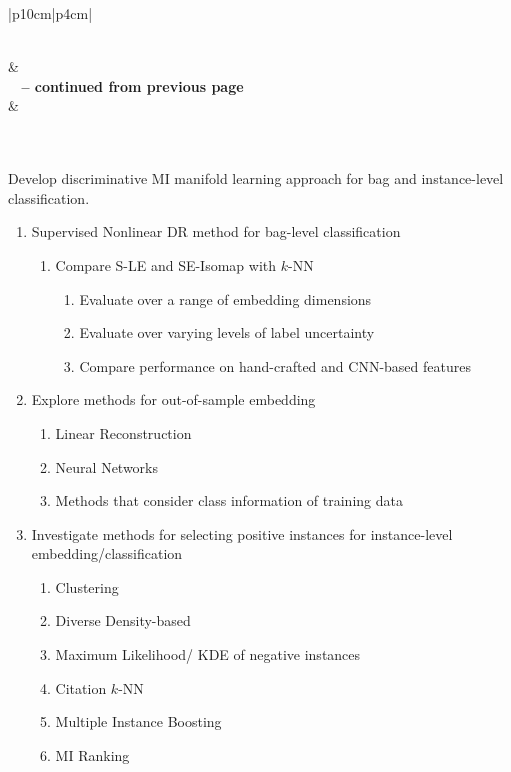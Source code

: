 \begin{longtable}{|p{10cm}|p{4cm}|} 
	\caption[List of research tasks.]{List of research tasks and their corresponding estimated dates for completion.}
	\label{tab:future_tasks}\\
	\hline {} &  \\ \hline
	\endfirsthead
	{{\bfseries \tablename\ \thetable{} -- continued from previous page}} \\
	\hline {} &  
	\\
	\hline
	\endhead
	\hline {} \\ \hline
	\endfoot
	\hline \hline
	\endlastfoot


	 \\
	\hline
	Develop discriminative MI manifold learning approach for bag and instance-level classification. 
	\begin{enumerate}
		\item Supervised Nonlinear DR method for bag-level classification \label{item:supervisedDR_bag_level}
		\begin{enumerate}
			\item Compare S-LE and SE-Isomap  with $k$-NN
			\begin{enumerate}
				\item Evaluate over a range of embedding dimensions
				\item Evaluate over varying levels of label uncertainty
				\item Compare performance on hand-crafted and CNN-based features
			\end{enumerate}
		\end{enumerate}
	
		\item Explore methods for out-of-sample embedding
		\begin{enumerate}
			\item Linear Reconstruction
			\item Neural Networks
			\item Methods that consider class information of training data
		\end{enumerate}
		
		\item Investigate methods for selecting positive instances for instance-level  embedding/classification
		\begin{enumerate}
			\item Clustering
			\item Diverse Density-based
			\item Maximum Likelihood/ KDE of negative instances
			\item Citation $k$-NN
			\item Multiple Instance Boosting
			\item MI Ranking
		\end{enumerate}
	

\end{enumerate}
\end{longtable}
